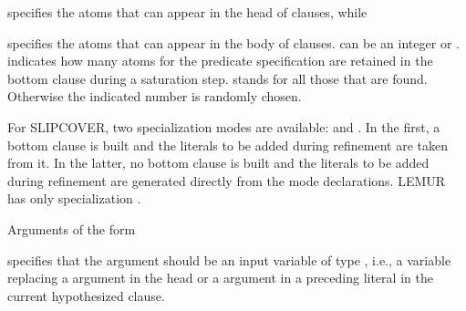 \documentclass[letterpaper,10pt,english]{sphinxmanual}
\begin{document}
\begin{sphinxVerbatim}[commandchars=\\\{\}]
\end{sphinxVerbatim}

specifies the atoms that can appear in the head of clauses, while

\begin{sphinxVerbatim}[commandchars=\\\{\}]
\end{sphinxVerbatim}

specifies the atoms that can appear in the body of clauses.  can be an integer or \sphinxcode{\sphinxupquote{*}}.  indicates how many atoms for the predicate specification are retained in the bottom clause during a saturation step. \sphinxcode{\sphinxupquote{*}} stands for all those that are found.
Otherwise the indicated number is randomly chosen.

For SLIPCOVER, two specialization modes are available:  and . In the first, a bottom clause is built and the literals to be added during refinement are taken from it. In the latter, no bottom clause is built and the literals to be added during refinement are generated directly from the mode declarations. LEMUR has only specialization .

Arguments of the form

\begin{sphinxVerbatim}[commandchars=\\\{\}]
\end{sphinxVerbatim}

specifies that the argument should be an input variable of type , i.e., a variable replacing a  argument in the head or a  argument in a preceding literal in the current hypothesized clause.
\end{document}
